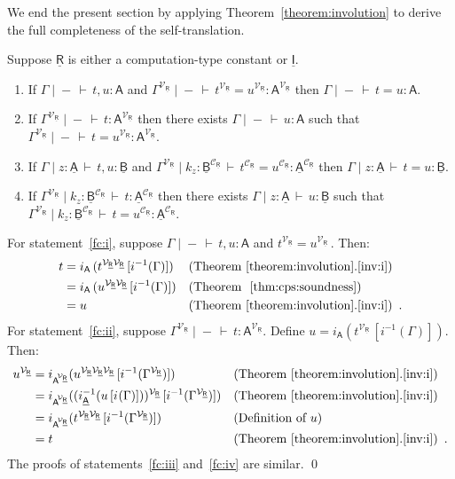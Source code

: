 \documentclass{LMCS}
\newcommand{\comptype}[1]{\underline{#1}}
\newcommand{\VA}{\mathsf{A}}
\newcommand{\CA}{\comptype{\mathsf{A}}}
\newcommand{\CB}{\comptype{\mathsf{B}}}
\newcommand{\CR}{\comptype{\mathsf{R}}}
\newcommand{\CI}{\comptype{\mathsf{I}}}
\newcommand{\In}[2]{#1 \colon  \! #2}
\newcommand{\rIn}[2]{#1 \colon  #2}
\newcommand{\Cj}[4]{#1 \mid  \! #2 \, \vdash \, \rIn{#3}{#4}}
\newcommand{\Vj}[3]{\Cj{#1}{{-}}{#2}{#3}}
\newcommand{\Ceq}[5]{#1 \mid  \! #2 \, \vdash \, #3 = #4 \colon #5}
\newcommand{\Veq}[4]{\Ceq{#1}{-}{#2}{#3}{#4}}
\newcommand{\Vappl}[2]{#1(#2)}
\newcommand{\CpsVT}[1]{#1^{\mathcal{V}_{\CR}}}
\newcommand{\CpsCT}[1]{#1^{\mathcal{C}_{\CR}}}
\newcommand{\CpsVVT}[1]{#1^{\mathcal{V}_{\CR}\mathcal{V}_{\CR}}}
\newcommand{\CpsVVVT}[1]{#1^{\mathcal{V}_{\CR}\mathcal{V}_{\CR}\mathcal{V}_{\CR}}}
\newcommand{\Viso}[1]{i_{#1}}
\begin{document}
We end the present section by applying Theorem~\ref{theorem:involution}
to derive the full completeness of
the self-translation.



\begin{thm} 
\label{thm:full:complete}
Suppose $\CR$ is either a computation-type constant or $\CI$.
\begin{enumerate}[\em(1)]
\item \label{fc:i}
  If $\Vj{\Gamma}{t,u}{\VA}$ and 
$\Veq{\CpsVT{\Gamma}}{\CpsVT{t}}{\CpsVT{u}}{\CpsVT{\VA}}$ 
then $\Veq{\Gamma}{t}{u}{\VA}$.

\item \label{fc:ii}
       If $\Vj{\CpsVT{\Gamma}}{t}{\CpsVT{\VA}}$ 
       then there exists  $\Vj{\Gamma}{u}{\VA}$ such that 
$\Veq{\CpsVT{\Gamma}}{t}{\CpsVT{u}}{\CpsVT{\VA}}$.

\item \label{fc:iii}
If $\Cj{\Gamma}{\In{z}{\CA}}{t,u}{\CB}$ and  
$\Ceq{\CpsVT{\Gamma}}{\In{k_z}{\CpsCT{\CB}}}{\CpsCT{t}}{\CpsCT{u}}{\CpsCT{\CA}}$
then $\Ceq{\Gamma}{\In{z}{\CA}}{t}{u}{\CB}$.

\item \label{fc:iv}
If $\Cj{\CpsVT{\Gamma}}{\In{k_z}{\CpsCT{\CB}}}{t}{\CpsCT{\CA}}$ then there exists 
$\Cj{\Gamma}{\In{z}{\CA}}{u}{\CB}$ such that \\
$\Ceq{\CpsVT{\Gamma}}{\In{k_z}{\CpsCT{\CB}}}{t}{\CpsCT{u}}{\CpsCT{\CA}}$.
\end{enumerate}
\end{thm}
\proof
For statement~\ref{fc:i}, suppose $\Vj{\Gamma}{t,u}{\VA}$ and $\CpsVT{t} = \CpsVT{u}\,$. Then:
\begin{align*}
t & = \Vappl{\Viso{\VA}\,}{\CpsVVT{t}\, [\Vappl{\Viso{}^{-1}}{\Gamma}]}
 && \text{(Theorem~\ref{theorem:involution}.\ref{inv:i})} 
\\
& = \Vappl{\Viso{\VA}\,}{\CpsVVT{u}\, [\Vappl{\Viso{}^{-1}}{\Gamma}]}
 && \text{(Theorem~~\ref{thm:cps:soundness})} 
\\
 & = u 
 && \text{(Theorem~\ref{theorem:involution}.\ref{inv:i})} \enspace .
\end{align*}
\noindent
For statement~\ref{fc:ii}, suppose $\Vj{\CpsVT{\Gamma}}{t}{\CpsVT{\VA}}$.
Define $u = \Vappl{\Viso{\VA}}{\CpsVT{t}\,[\Vappl{\Viso{}^{-1}}{\Gamma}]}$. Then:
\begin{align*}
\CpsVT{u} & =  \Vappl{\Viso{{\CpsVT{\VA\!}}}}{\CpsVVVT{u} \, [\Vappl{\Viso{}^{-1}}{\CpsVT{\Gamma}}]}
 && \text{(Theorem~\ref{theorem:involution}.\ref{inv:i})} \\
& = \Vappl{\Viso{{\CpsVT{\VA\!}}}}
      {\CpsVT{( \Vappl{\Viso{\CA}^{-1}}{u \, [\Viso{}(\Gamma)]})} \,[\Vappl{\Viso{}^{-1}}{\CpsVT{\Gamma}}]}
 && \text{(Theorem~\ref{theorem:involution}.\ref{inv:i})} \\
& = \Vappl{\Viso{{\CpsVT{\VA\!}}}}{\CpsVVT{t} \, [\Vappl{\Viso{}^{-1}}{\CpsVT{\Gamma}}]}
 && \text{(Definition of $u$)} \\
& = t 
 && \text{(Theorem~\ref{theorem:involution}.\ref{inv:i})} \enspace .
\end{align*}
The proofs of statements~\ref{fc:iii} and~\ref{fc:iv} are similar.
\qed
\end{document}
